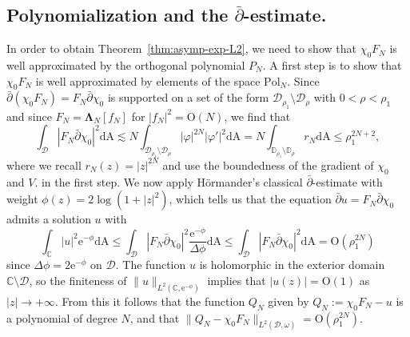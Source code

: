 \documentclass{amsart}
\newcommand{\be}{\begin{equation}}
\newcommand{\ee}{\end{equation}}
\newcommand{\C}{\mathbb{C}}
\newcommand{\D}{\mathbb{D}}
\newcommand{\calD}{\mathcal{D}}
\newcommand{\diffA}{\mathrm{dA}}
\newcommand{\Lamop}{\mathbf{\Lambda}}
\theoremstyle{definition}
\theoremstyle{remark}
\newcommand{\e}{\mathrm{e}}
\newcommand{\Ordo}{\mathrm{O}}
\numberwithin{equation}{subsection}
\begin{document}
\subsection{Polynomialization and the $\bar\partial$-estimate.} 
\label{ref:d-bar}
In order to obtain Theorem~\ref{thm:asymp-exp-L2}, we need
to show that $\chi_0F_N$ is well approximated by the orthogonal polynomial
$P_N$. A first step is to show that
$\chi_0F_N$ is well approximated by elements of the space $\mathrm{Pol}_{N}$.
Since $\bar\partial(\chi_0F_N)=F_N\bar\partial\chi_0$ is supported
on a set of the form $\calD_{\rho_1}\setminus\calD_\rho$ with $0<\rho<\rho_1$
and since $F_N=\Lamop_N[f_N]$ for $|f_N|^2=\Ordo(N)$,
we find that
\be
\int_\calD |F_N\bar\partial\chi_0|^2\diffA
\lesssim
N\int_{\calD_{\rho_1}\setminus\calD_\rho}|\varphi|^{2N}|\varphi'|^2\diffA
=N\int_{\D_{\rho_1}\setminus\D_\rho}r_N\diffA\le \rho_1^{2N+2},
\ee
where we recall $r_N(z)=|z|^{2N}$ and 
use the boundedness of the gradient of $\chi_0$ and $V$.
in the first step.
We now apply H{\"o}rmander's classical $\bar\partial$-estimate 
with weight $\phi(z)=2\log(1+|z|^2)$, which tells us that the equation
$\bar\partial u=F_N\bar\partial\chi_0$ admits a solution $u$ with
\be
\int_\C|u|^2\e^{-\phi}\diffA\le 
\int_{\calD}|F_N\bar\partial\chi_0|^2\frac{\e^{-\phi}}{\Delta \phi}
\diffA\le \int_\calD |F_N\bar\partial\chi_0|^2\diffA
=\Ordo(\rho_1^{2N})
\ee
since $\Delta\phi=2\e^{-\phi}$ on $\calD$.
The function $u$ is holomorphic in the exterior domain $\C\setminus\calD$,
so the finiteness of $\lVert u\rVert_{L^2(\C,\e^{-\phi})}$ implies
that $|u(z)|=\Ordo(1)$ as $|z|\to+\infty$.
From this it follows that the function $Q_N$ given by 
$Q_N:=\chi_0 F_N-u$
is a polynomial of degree $N$, 
and that $\lVert Q_N-\chi_0 F_N\rVert_{L^2(\calD,\omega)}=\Ordo(\rho_1^{2N})$.
\end{document}
